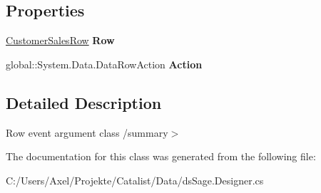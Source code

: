 \subsection*{Properties}
\begin{DoxyCompactItemize}
\item 
\hyperlink{class_products_1_1_data_1_1ds_sage_1_1_customer_sales_row}{Customer\+Sales\+Row} {\bfseries Row}\hypertarget{class_products_1_1_data_1_1ds_sage_1_1_customer_sales_row_change_event_af6d42d72b44010dbb0ea81c8716e23ec}{}\label{class_products_1_1_data_1_1ds_sage_1_1_customer_sales_row_change_event_af6d42d72b44010dbb0ea81c8716e23ec}

\item 
global\+::\+System.\+Data.\+Data\+Row\+Action {\bfseries Action}\hypertarget{class_products_1_1_data_1_1ds_sage_1_1_customer_sales_row_change_event_a3f3f33e006e3b9dce410cf9db7bd17de}{}\label{class_products_1_1_data_1_1ds_sage_1_1_customer_sales_row_change_event_a3f3f33e006e3b9dce410cf9db7bd17de}

\end{DoxyCompactItemize}


\subsection{Detailed Description}
Row event argument class /summary$>$ 

The documentation for this class was generated from the following file\+:\begin{DoxyCompactItemize}
\item 
C\+:/\+Users/\+Axel/\+Projekte/\+Catalist/\+Data/ds\+Sage.\+Designer.\+cs\end{DoxyCompactItemize}
